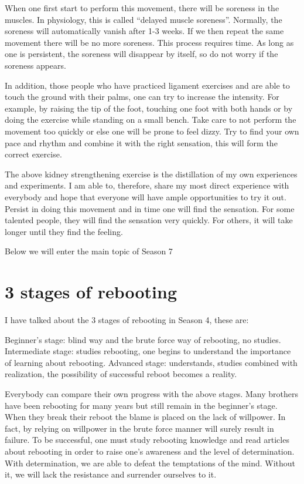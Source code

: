 \documentclass[
]{book}
\begin{document}
When one first start to perform this movement, there will be soreness in the muscles. In physiology, this is called ``delayed muscle soreness''. Normally, the soreness will automatically vanish after 1-3 weeks. If we then repeat the same movement there will be no more soreness. This process requires time. As long as one is persistent, the soreness will disappear by itself, so do not worry if the soreness appears.

In addition, those people who have practiced ligament exercises and are able to touch the ground with their palms, one can try to increase the intensity. For example, by raising the tip of the foot, touching one foot with both hands or by doing the exercise while standing on a small bench. Take care to not perform the movement too quickly or else one will be prone to feel dizzy. Try to find your own pace and rhythm and combine it with the right sensation, this will form the correct exercise.

The above kidney strengthening exercise is the distillation of my own experiences and experiments. I am able to, therefore, share my most direct experience with everybody and hope that everyone will have ample opportunities to try it out. Persist in doing this movement and in time one will find the sensation. For some talented people, they will find the sensation very quickly. For others, it will take longer until they find the feeling.

Below we will enter the main topic of Season 7

\hypertarget{stages-of-rebooting}{%
\section{3 stages of rebooting}\label{stages-of-rebooting}}

I have talked about the 3 stages of rebooting in Season 4, these are:

Beginner's stage: blind way and the brute force way of rebooting, no studies.
Intermediate stage: studies rebooting, one begins to understand the importance of learning about rebooting.
Advanced stage: understands, studies combined with realization, the possibility of successful reboot becomes a reality.

Everybody can compare their own progress with the above stages. Many brothers have been rebooting for many years but still remain in the beginner's stage. When they break their reboot the blame is placed on the lack of willpower. In fact, by relying on willpower in the brute force manner will surely result in failure. To be successful, one must study rebooting knowledge and read articles about rebooting in order to raise one's awareness and the level of determination. With determination, we are able to defeat the temptations of the mind. Without it, we will lack the resistance and surrender ourselves to it.
\end{document}

